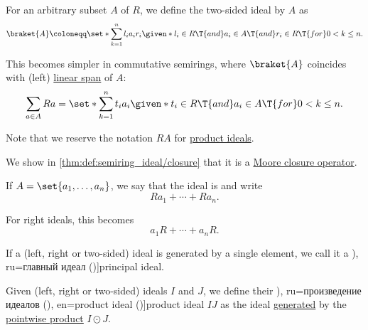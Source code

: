 \begin{definition}
\begin{thmenum}[resume=def:semiring_ideal]
     For an arbitrary subset \( A \) of \( R \), we define the two-sided ideal  by \( A \) as
    \begin{equation}\label{eq:def:semiring_ideal/generated}
      \braket{ A } \coloneqq \set*{ \sum_{k=1}^n l_i a_i r_i \given* l_i \in R \T{and} a_i \in A \T{and} r_i \in R \T{for} 0 < k \leq n }.
    \end{equation}

    This becomes simpler in commutative semirings, where \( \braket{ A } \) coincides with (left) \hyperref[def:semimodule/subobject]{linear span} of \( A \):
    \begin{equation*}
      \sum_{a \in A} R a = \set*{ \sum_{k=1}^n t_i a_i \given* t_i \in R \T{and} a_i \in A \T{for} 0 < k \leq n }.
    \end{equation*}

    Note that we reserve the notation \( RA \) for \hyperref[def:semiring_ideal/product]{product ideals}.

    We show in \cref{thm:def:semiring_ideal/closure} that it is a \hyperref[def:moore_closure_operator]{Moore closure operator}.

    If \( A = \set{ a_1, \ldots, a_n } \), we say that the ideal is  and write
    \begin{equation*}
      R a_1 + \cdots + R a_n.
    \end{equation*}

    For right ideals, this becomes
    \begin{equation*}
      a_1 R + \cdots + a_n R.
    \end{equation*}

     If a (left, right or two-sided) ideal is generated by a single element, we call it a \term[bg=главен идеал (\cite[def. V.8]{ГеновМиховскиМоллов1991Алгебра}), ru=главный идеал (\cite[392]{Винберг2014КурсАлгебры})]{principal ideal}.

    \mimprovised Given (left, right or two-sided) ideals \( I \) and \( J \), we define their \term[bg=произведение на идеали (\cite[3]{КоцевСидеров2016КомутативнаАлгебра}), ru=произведение идеалов (\cite[337]{Тыртышников2017ОсновыАлгебры}), en=product ideal (\cite[413]{Knapp2016BasicAlgebra})]{product ideal} \( IJ \) as the ideal \hyperref[def:semiring_ideal/generated]{generated} by the \hyperref[def:power_semigroup]{pointwise product} \( I \odot J \).


\end{thmenum}
\end{definition}
